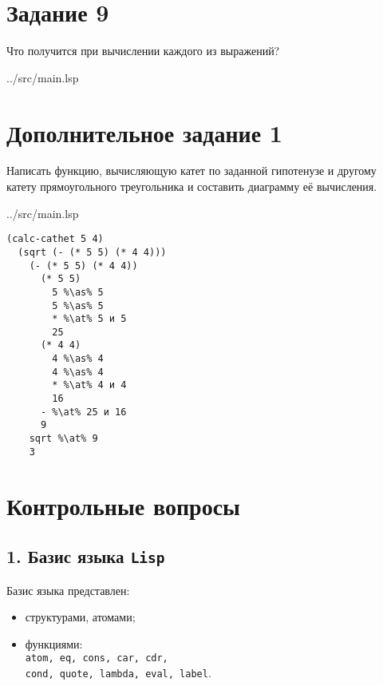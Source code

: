 \section*{Задание 9}

Что получится при вычислении каждого из выражений?

\begin{lstinputlisting}[
	caption={Задание 9},
	label={lst:t9},
	style={lsp},
	linerange={45-51},
	]{../src/main.lsp}
\end{lstinputlisting}

\section*{Дополнительное задание 1}

Написать функцию, вычисляющую катет по заданной гипотенузе и другому катету прямоугольного треугольника и составить диаграмму её вычисления. 

\begin{lstinputlisting}[
	caption={Дополнительное задание 1},
	label={lst:e1},
	style={lsp},
	linerange={54-55},
	]{../src/main.lsp}
\end{lstinputlisting}

\begin{lstlisting}[style={scheme}]
(calc-cathet 5 4)
  (sqrt (- (* 5 5) (* 4 4)))
    (- (* 5 5) (* 4 4))
      (* 5 5)
	    5 %\as% 5
	    5 %\as% 5
        * %\at% 5 и 5
        25
      (* 4 4)
        4 %\as% 4
        4 %\as% 4
        * %\at% 4 и 4
        16
      - %\at% 25 и 16
      9
    sqrt %\at% 9
    3
\end{lstlisting}

\section*{Контрольные вопросы}

\subsection*{1. Базис языка {\texttt{Lisp}}}

Базис языка представлен:
\begin{itemize}
	\item структурами, атомами;
	\item функциями:\\
	{\texttt{atom, eq, cons, car, cdr,}}\\
	{\texttt{cond, quote, lambda, eval, label}}.
\end{itemize}

